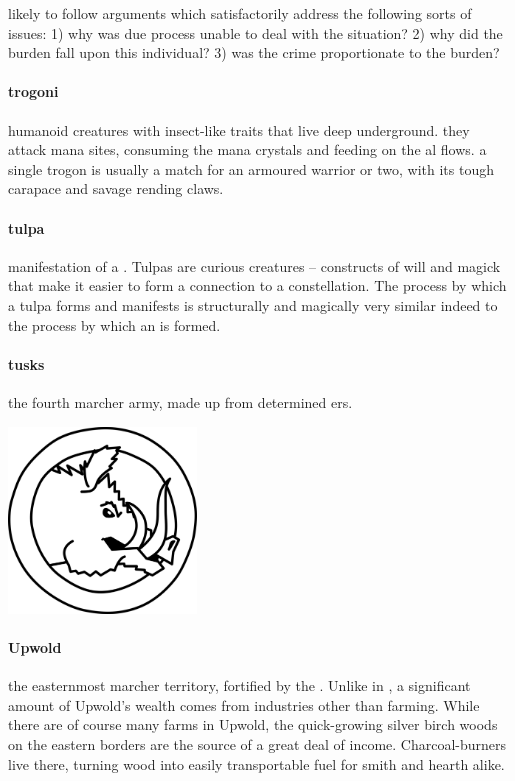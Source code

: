 likely to follow arguments which satisfactorily address the following sorts of issues: 1) why was due process unable to deal with the situation? 2) why did the burden fall upon this individual? 3) was the crime proportionate to the burden? 
\bigparagraphendtwiddle
\paragraph{trogoni} humanoid creatures with insect-like traits that live deep underground. they attack mana sites, consuming the mana crystals and feeding on the al flows. a single trogon is usually a match for an armoured warrior or two, with its tough carapace and savage rending claws.
\paragraph{tulpa} manifestation of a . Tulpas are curious creatures – constructs of will and magick that make it easier to form a connection to a constellation. The process by which a tulpa forms and manifests is structurally and magically very similar indeed to the process by which an  is formed.
\paragraph{tusks} the fourth marcher army, made up from determined ers.  \begin{center}\includegraphics[width=5cm]{encyclopedia/Tusks}\end{center}
\paragraph{Upwold} the easternmost marcher territory, fortified by the . Unlike in , a significant amount of Upwold's wealth comes from industries other than farming. While there are of course many farms in Upwold, the quick-growing silver birch woods on the eastern borders are the source of a great deal of income. Charcoal-burners live there, turning wood into easily transportable fuel for smith and hearth alike.
